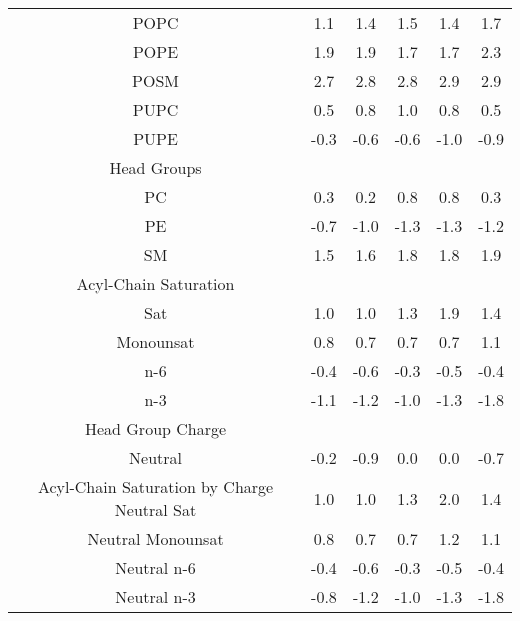 \documentclass[9pt]{article}
\begin{document}
\begin{table}
{\begin{tabular}{| c || ccccc |}
POPC    &1.1&1.4&1.5&1.4&1.7\\
POPE    &1.9&1.9&1.7&1.7&2.3\\
POSM    &2.7&2.8&2.8&2.9&2.9\\
PUPC    &0.5&0.8&1.0&0.8&0.5\\
PUPE    &-0.3&-0.6&-0.6&-1.0&-0.9\\
\hline
Head Groups &&&&&\\
PC      &0.3&0.2&0.8&0.8&0.3\\
PE      &-0.7&-1.0&-1.3&-1.3&-1.2\\
SM      &1.5&1.6&1.8&1.8&1.9\\
\hline
Acyl-Chain Saturation &&&&&\\
Sat      &1.0&1.0&1.3&1.9&1.4\\
Monounsat      &0.8&0.7&0.7&0.7&1.1\\
n-6&-0.4&-0.6&-0.3&-0.5&-0.4\\
n-3&-1.1&-1.2&-1.0&-1.3&-1.8\\
\hline
Head Group Charge &&&&&\\
Neutral &-0.2&-0.9&0.0&0.0&-0.7\\
\hline
Acyl-Chain Saturation by Charge 
Neutral Sat    &1.0&1.0&1.3&2.0&1.4\\
Neutral Monounsat    &0.8&0.7&0.7&1.2&1.1\\
Neutral n-6&-0.4&-0.6&-0.3&-0.5&-0.4\\
Neutral n-3&-0.8&-1.2&-1.0&-1.3&-1.8\\
\hline
\end{tabular}}
\end{table}
\end{document}
